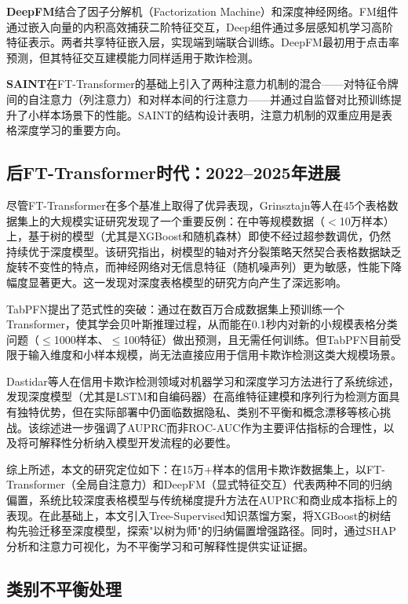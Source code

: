 \textbf{DeepFM}\cite{guo2017deepfm}结合了因子分解机（Factorization Machine）和深度神经网络。FM组件通过嵌入向量的内积高效捕获二阶特征交互，Deep组件通过多层感知机学习高阶特征表示。两者共享特征嵌入层，实现端到端联合训练。DeepFM最初用于点击率预测，但其特征交互建模能力同样适用于欺诈检测。

\textbf{SAINT}\cite{somepalli2022saint}在FT-Transformer的基础上引入了两种注意力机制的混合——对特征令牌间的自注意力（列注意力）和对样本间的行注意力——并通过自监督对比预训练提升了小样本场景下的性能。SAINT的结构设计表明，注意力机制的双重应用是表格深度学习的重要方向。

\subsection{后FT-Transformer时代：2022--2025年进展}

尽管FT-Transformer在多个基准上取得了优异表现，Grinsztajn等人\cite{grinsztajn2022tree}在45个表格数据集上的大规模实证研究发现了一个重要反例：在中等规模数据（$<$10万样本）上，基于树的模型（尤其是XGBoost和随机森林）即使不经过超参数调优，仍然持续优于深度模型。该研究指出，树模型的轴对齐分裂策略天然契合表格数据缺乏旋转不变性的特点，而神经网络对无信息特征（随机噪声列）更为敏感，性能下降幅度显著更大。这一发现对深度表格模型的研究方向产生了深远影响。

TabPFN\cite{hollmann2023tabpfn}提出了范式性的突破：通过在数百万合成数据集上预训练一个Transformer，使其学会贝叶斯推理过程，从而能在0.1秒内对新的小规模表格分类问题（$\le$1000样本、$\le$100特征）做出预测，且无需任何训练。但TabPFN目前受限于输入维度和小样本规模，尚无法直接应用于信用卡欺诈检测这类大规模场景。

Dastidar等人\cite{dastidar2024survey}在信用卡欺诈检测领域对机器学习和深度学习方法进行了系统综述，发现深度模型（尤其是LSTM和自编码器）在高维特征建模和序列行为检测方面具有独特优势，但在实际部署中仍面临数据隐私、类别不平衡和概念漂移等核心挑战。该综述进一步强调了AUPRC而非ROC-AUC作为主要评估指标的合理性，以及将可解释性分析纳入模型开发流程的必要性。

综上所述，本文的研究定位如下：在15万+样本的信用卡欺诈数据集上，以FT-Transformer（全局自注意力）和DeepFM（显式特征交互）代表两种不同的归纳偏置，系统比较深度表格模型与传统梯度提升方法在AUPRC和商业成本指标上的表现。在此基础上，本文引入Tree-Supervised知识蒸馏方案，将XGBoost的树结构先验迁移至深度模型，探索"以树为师"的归纳偏置增强路径。同时，通过SHAP分析和注意力可视化，为不平衡学习和可解释性提供实证证据。

\subsection{类别不平衡处理}

